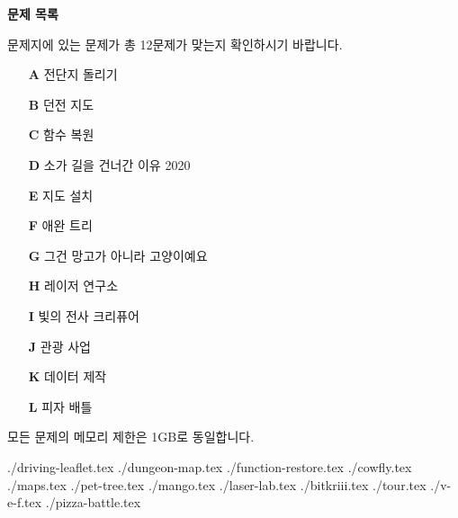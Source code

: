 \documentclass[10pt,a4paper,oneside,dvipsnames]{article}
\newcommand{\importproblem}[1]{{./#1.tex}}
\begin{document}
\BuildContestTitle

\raggedbottom

\begin{center}
    \textbf{\Large\textsf{문제 목록}}
\end{center}

문제지에 있는 문제가 총 12문제가 맞는지 확인하시기 바랍니다.

\begin{center}
    \begin{minipage}{0.35\textwidth}
        \begin{itemize}
            \item[\textbf{A}] 전단지 돌리기
            \item[\textbf{B}] 던전 지도
            \item[\textbf{C}] 함수 복원
            \item[\textbf{D}] 소가 길을 건너간 이유 2020
            \item[\textbf{E}] 지도 설치
            \item[\textbf{F}] 애완 트리
            \item[\textbf{G}] 그건 망고가 아니라 고양이예요
            \item[\textbf{H}] 레이저 연구소
            \item[\textbf{I}] 빛의 전사 크리퓨어
            \item[\textbf{J}] 관광 사업
            \item[\textbf{K}] 데이터 제작
            \item[\textbf{L}] 피자 배틀
        \end{itemize}    
    \end{minipage}
\end{center}

모든 문제의 메모리 제한은 1GB로 동일합니다.
\newpage

\importproblem{driving-leaflet} %
\importproblem{dungeon-map} %
\importproblem{function-restore} %
\importproblem{cowfly} %
\importproblem{maps} %
\importproblem{pet-tree} %
\importproblem{mango} %
\importproblem{laser-lab} %
\importproblem{bitkriii} %
\importproblem{tour} %
\importproblem{v-e-f} %
\importproblem{pizza-battle} %
\end{document}
